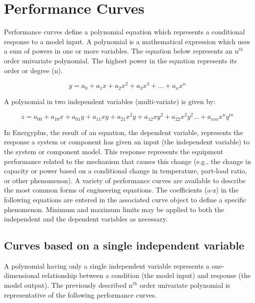 \section{Performance Curves}\label{performance-curves-000}

Performance curves define a polynomial equation which represents a conditional response to a model input. A polynomial is a mathematical expression which uses a sum of powers in one or more variables. The equation below represents an n\(^{th}\) order univariate polynomial. The highest power in the equation represents its order or degree (n).

\begin{equation}
y = {a_0} + {a_1}x + {a_2}{x^2} + {a_3}{x^3} + ... + {a_n}{x^n}
\end{equation}

A polynomial in two independent variables (multi-variate) is given by:

\begin{equation}
z = {a_{00}} + {a_{10}}x + {a_{01}}y + {a_{11}}xy + {a_{21}}{x^2}y + {a_{12}}x{y^2} + {a_{22}}{x^2}{y^2}... + {a_{nm}}{x^n}{y^m}
\end{equation}

In Energyplus, the result of an equation, the dependent variable, represents the response a system or component has given an input (the independent variable) to the system or component model. This response represents the equipment performance related to the mechanism that causes this change (e.g., the change in capacity or power based on a conditional change in temperature, part-load ratio, or other phenomenon). A variety of performance curves are available to describe the most common forms of engineering equations. The coefficients (a-z) in the following equations are entered in the associated curve object to define a specific phenomenon. Minimum and maximum limits may be applied to both the independent and the dependent variables as necessary.

\subsection{Curves based on a single independent variable}\label{curves-based-on-a-single-independent-variable}

A polynomial having only a single independent variable represents a one-dimensional relationship between a condition (the model input) and response (the model output). The previously described n\(^{th}\) order univariate polynomial is representative of the following performance curves.


